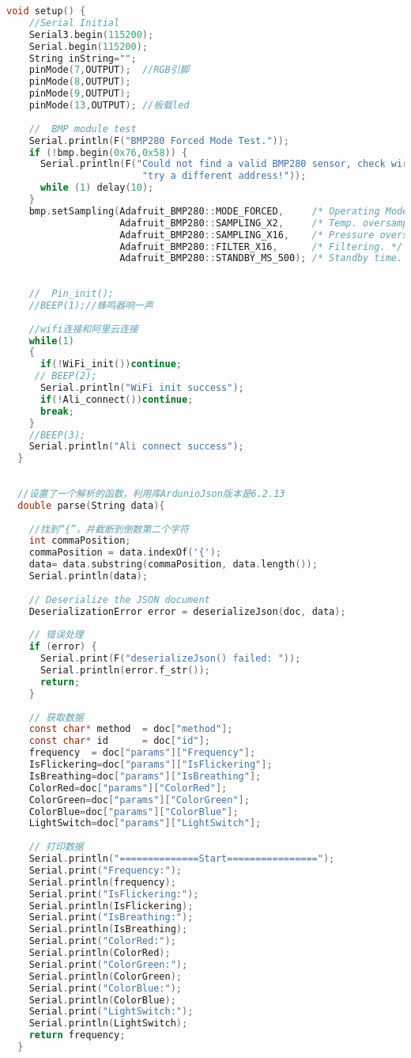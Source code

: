 \documentclass[12pt,hyperref,a4paper,UTF8]{ctexart}
\begin{document}
\begin{lstlisting}[language=C]
  void setup() {
    //Serial Initial
    Serial3.begin(115200);
    Serial.begin(115200);
    String inString="";
    pinMode(7,OUTPUT);  //RGB引脚
    pinMode(8,OUTPUT); 
    pinMode(9,OUTPUT); 
    pinMode(13,OUTPUT); //板载led
    
    //  BMP module test
    Serial.println(F("BMP280 Forced Mode Test."));
    if (!bmp.begin(0x76,0x58)) {
      Serial.println(F("Could not find a valid BMP280 sensor, check wiring or "
                        "try a different address!"));
      while (1) delay(10);
    }
    bmp.setSampling(Adafruit_BMP280::MODE_FORCED,     /* Operating Mode. */
                    Adafruit_BMP280::SAMPLING_X2,     /* Temp. oversampling */
                    Adafruit_BMP280::SAMPLING_X16,    /* Pressure oversampling */
                    Adafruit_BMP280::FILTER_X16,      /* Filtering. */
                    Adafruit_BMP280::STANDBY_MS_500); /* Standby time. */
  
    
    //  Pin_init();
    //BEEP(1);//蜂鸣器响一声
    
    //wifi连接和阿里云连接
    while(1)
    {
      if(!WiFi_init())continue;
     // BEEP(2);
      Serial.println("WiFi init success");
      if(!Ali_connect())continue;
      break;
    }
    //BEEP(3);
    Serial.println("Ali connect success");
  }
  
  
  //设置了一个解析的函数，利用库ArdunioJson版本是6.2.13
  double parse(String data){
  
    //找到“{”，并截断到倒数第二个字符
    int commaPosition;  
    commaPosition = data.indexOf('{');
    data= data.substring(commaPosition, data.length());
    Serial.println(data);
    
    // Deserialize the JSON document
    DeserializationError error = deserializeJson(doc, data);
  
    // 错误处理
    if (error) {
      Serial.print(F("deserializeJson() failed: "));
      Serial.println(error.f_str());
      return;
    }
  
    // 获取数据
    const char* method  = doc["method"];
    const char* id      = doc["id"];
    frequency  = doc["params"]["Frequency"];
    IsFlickering=doc["params"]["IsFlickering"];
    IsBreathing=doc["params"]["IsBreathing"];
    ColorRed=doc["params"]["ColorRed"];
    ColorGreen=doc["params"]["ColorGreen"];
    ColorBlue=doc["params"]["ColorBlue"];
    LightSwitch=doc["params"]["LightSwitch"];
  
    // 打印数据
    Serial.println("==============Start================");
    Serial.print("Frequency:");
    Serial.println(frequency);
    Serial.print("IsFlickering:");
    Serial.println(IsFlickering);
    Serial.print("IsBreathing:");
    Serial.println(IsBreathing);
    Serial.print("ColorRed:");
    Serial.println(ColorRed);
    Serial.print("ColorGreen:");
    Serial.println(ColorGreen);
    Serial.print("ColorBlue:");
    Serial.println(ColorBlue);
    Serial.print("LightSwitch:");
    Serial.println(LightSwitch);
    return frequency;
  }
    

\end{lstlisting}
\end{document}

